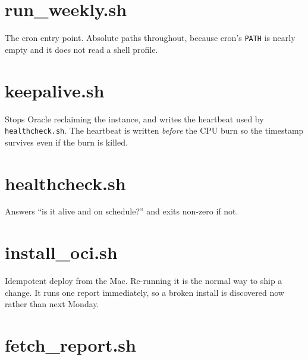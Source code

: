 \documentclass[11pt,a4paper]{article}
\begin{document}


\section{run\_weekly.sh}

The cron entry point. Absolute paths throughout, because cron's
\texttt{PATH} is nearly empty and it does not read a shell profile.



\section{keepalive.sh}

Stops Oracle reclaiming the instance, and writes the heartbeat used by
\texttt{healthcheck.sh}. The heartbeat is written \emph{before} the CPU
burn so the timestamp survives even if the burn is killed.



\section{healthcheck.sh}

Answers ``is it alive and on schedule?'' and exits non-zero if not.



\section{install\_oci.sh}

Idempotent deploy from the Mac. Re-running it is the normal way to ship
a change. It runs one report immediately, so a broken install is
discovered now rather than next Monday.



\section{fetch\_report.sh}
\end{document}
